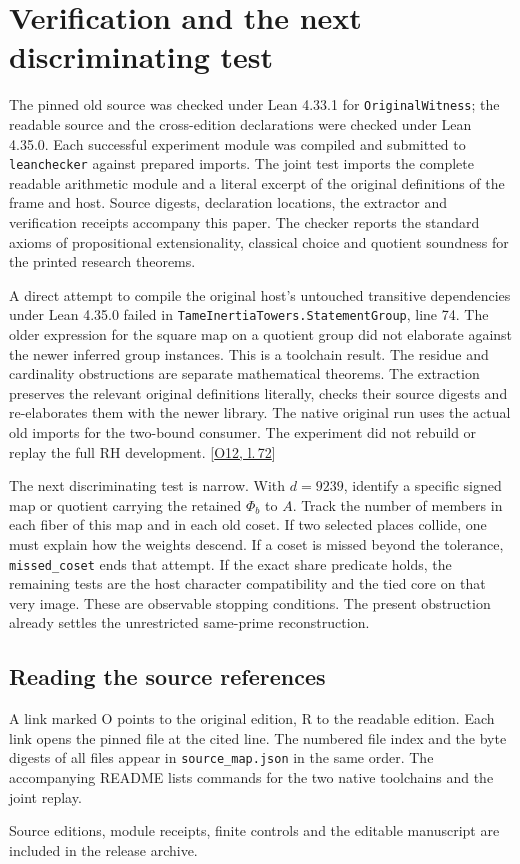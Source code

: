 \documentclass[12pt,letterpaper]{article}
\newcommand{\id}[1]{{\small\nolinkurl{#1}}}
\begin{document}
\section{Verification and the next discriminating test}
The pinned old source was checked under Lean 4.33.1 for \id{OriginalWitness}; the readable source and the cross-edition declarations were checked under Lean 4.35.0. Each successful experiment module was compiled and submitted to \id{leanchecker} against prepared imports. The joint test imports the complete readable arithmetic module and a literal excerpt of the original definitions of the frame and host. Source digests, declaration locations, the extractor and verification receipts accompany this paper. The checker reports the standard axioms of propositional extensionality, classical choice and quotient soundness for the printed research theorems.

A direct attempt to compile the original host's untouched transitive dependencies under Lean 4.35.0 failed in \id{TameInertiaTowers.StatementGroup}, line 74. The older expression for the square map on a quotient group did not elaborate against the newer inferred group instances. This is a toolchain result. The residue and cardinality obstructions are separate mathematical theorems. The extraction preserves the relevant original definitions literally, checks their source digests and re-elaborates them with the newer library. The native original run uses the actual old imports for the two-bound consumer. The experiment did not rebuild or replay the full RH development. {\footnotesize\sffamily\color{mute}[\href{https://github.com/nousentllc/riemann-hypothesis/blob/40e56bab026552e089d7afcfeff08d2defb9c005/src/Formalism/TameInertiaTowers/StatementGroup.lean#L72}{O12, l.\,72}]}

The next discriminating test is narrow. With $d=9239$, identify a specific signed map or quotient carrying the retained $\Phi_b$ to $A$. Track the number of members in each fiber of this map and in each old coset. If two selected places collide, one must explain how the weights descend. If a coset is missed beyond the tolerance, \id{missed_coset} ends that attempt. If the exact share predicate holds, the remaining tests are the host character compatibility and the tied core on that very image. These are observable stopping conditions. The present obstruction already settles the unrestricted same-prime reconstruction.
\subsection*{Reading the source references}
A link marked O points to the original edition, R to the readable edition. Each link opens the pinned file at the cited line. The numbered file index and the byte digests of all files appear in \id{source_map.json} in the same order. The accompanying README lists commands for the two native toolchains and the joint replay.

\medskip\small\sffamily\color{mute}Source editions, module receipts, finite controls and the editable manuscript are included in the release archive.
\end{document}
